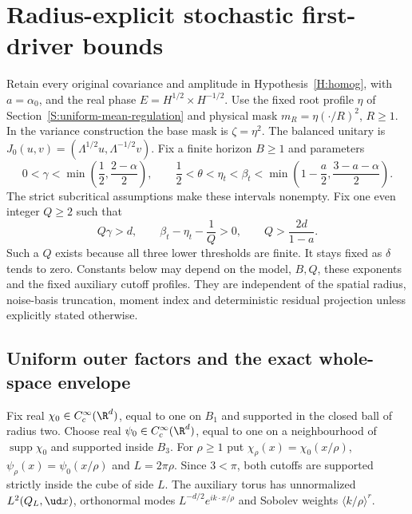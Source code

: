 \section{Radius-explicit stochastic first-driver bounds}
\label{S:radius-stochastic-anchor}

Retain every original covariance and amplitude in Hypothesis~\ref{H:homog},
with $a=\alpha_0$, and the real phase $E=H^{1/2}\times H^{-1/2}$.
Use the fixed root profile $\eta$ of Section~\ref{S:uniform-mean-regulation}
and physical mask $m_R=\eta(\cdot/R)^2$, $R\ge1$.
In the variance construction the base mask is $\zeta=\eta^2$.
The balanced unitary is
$J_0(u,v)=(\Lambda^{1/2}u,\Lambda^{-1/2}v)$.
Fix a finite horizon $B\ge1$ and parameters
\begin{equation}\label{E:radius-anchor-parameters}
  0<\gamma<\min\left(\frac12,\frac{2-\alpha}{2}\right),\qquad
  \frac12<\theta<\eta_t<\beta_t<
  \min\left(1-\frac a2,\frac{3-a-\alpha}{2}\right).
\end{equation}
The strict subcritical assumptions make these intervals nonempty.
Fix one even integer $Q\ge2$ such that
\begin{equation}\label{E:radius-anchor-Q}
  Q\gamma>d,\qquad
  \beta_t-\eta_t-\frac1Q>0,\qquad
  Q>\frac{2d}{1-a}.
\end{equation}
Such a $Q$ exists because all three lower thresholds are finite.
It stays fixed as $\delta$ tends to zero.
Constants below may depend on the model, $B,Q$, these exponents and the
fixed auxiliary cutoff profiles. They are independent of the spatial
radius, noise-basis truncation, moment index and deterministic residual
projection unless explicitly stated otherwise.

\subsection{Uniform outer factors and the exact whole-space envelope}

Fix real $\chi_0\in C_c^\infty(\R^d)$, equal to one on $B_1$ and
supported in the closed ball of radius two.
Choose real $\psi_0\in C_c^\infty(\R^d)$, equal to one on a
neighbourhood of $\operatorname{supp}\chi_0$ and supported inside $B_3$.
For $\rho\ge1$ put $\chi_\rho(x)=\chi_0(x/\rho)$,
$\psi_\rho(x)=\psi_0(x/\rho)$ and $L=2\pi\rho$.
Since $3<\pi$, both cutoffs are supported strictly inside the cube
of side $L$. The auxiliary torus has unnormalized $L^2(Q_L,\ud x)$,
orthonormal modes $L^{-d/2}e^{ik\cdot x/\rho}$ and Sobolev weights
$\langle k/\rho\rangle^r$.

